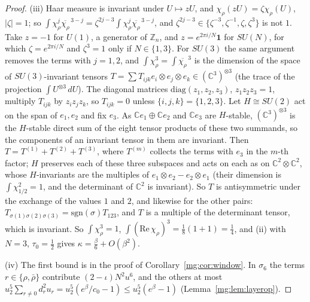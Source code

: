 \documentclass[11pt,a4paper]{article}
\theoremstyle{definition}
\theoremstyle{remark}
\newcommand{\C}{\mathbb{C}}
\newcommand{\dU}{\,dU}
\begin{document}
\begin{proof}
(iii) Haar measure is invariant under $U\mapsto zU$, and $\chi_\rho(zU)=\zeta\chi_\rho(U)$, $|\zeta|=1$; so
$\int\chi_\rho^j\overline{\chi_\rho}^{\,3-j}=\zeta^{2j-3}\int\chi_\rho^j\overline{\chi_\rho}^{\,3-j}$, and $\zeta^{2j-3}\in\{\zeta^{-3},\zeta^{-1},\zeta,\zeta^3\}$ is
not $1$. Take $z=-1$ for $U(1)$, a generator of $\mathbb Z_n$, and $z=e^{2\pi i/N}\mathbf1$ for $SU(N)$, for which $\zeta=e^{2\pi i/N}$ and $\zeta^3=1$ only
if $N\in\{1,3\}$. For $SU(3)$ the same argument removes the terms with $j=1,2$, and $\int\chi_\rho^3=\int\overline{\chi_\rho}^{\,3}$ is the dimension of the
space of $SU(3)$-invariant tensors $T=\sum T_{ijk}e_i\otimes e_j\otimes e_k\in(\C^3)^{\otimes3}$ (the trace of the projection $\int U^{\otimes3}\dU$). The
diagonal matrices $\mathrm{diag}(z_1,z_2,z_3)$, $z_1z_2z_3=1$, multiply $T_{ijk}$ by $z_iz_jz_k$, so $T_{ijk}=0$ unless $\{i,j,k\}=\{1,2,3\}$. Let
$H\cong SU(2)$ act on the span of $e_1,e_2$ and fix $e_3$. As $\C e_1\oplus\C e_2$ and $\C e_3$ are $H$-stable, $(\C^3)^{\otimes3}$ is the $H$-stable
direct sum of the eight tensor products of these two summands, so the components of an invariant tensor in them are invariant. Then $T=T^{(1)}+T^{(2)}+T^{(3)}$, where $T^{(m)}$ collects the terms with $e_3$ in the $m$-th
factor; $H$ preserves each of these three subspaces and acts on each as on $\C^2\otimes\C^2$, whose $H$-invariants are the multiples of
$e_1\otimes e_2-e_2\otimes e_1$ (their dimension is $\int\chi_{1/2}^2=1$, and the determinant of $\C^2$ is invariant). So $T$ is antisymmetric under the
exchange of the values $1$ and $2$, and likewise for the other pairs: $T_{\sigma(1)\sigma(2)\sigma(3)}=\mathrm{sgn}(\sigma)T_{123}$, and $T$ is a multiple of
the determinant tensor, which is invariant. So $\int\chi_\rho^3=1$,
$\int(\mathrm{Re}\,\chi_\rho)^3=\frac18(1+1)=\frac14$, and (ii) with $N=3$, $\tau_0=\frac12$ gives $\kappa=\frac\beta6+O(\beta^2)$.

(iv) The first bound is in the proof of Corollary~\ref{mg:cor:window}. In $\sigma_6$ the terms $r\in\{\rho,\bar\rho\}$ contribute $(2-\iota)N^2u^6$, and the
others at most $u_2^5\sum_{r\ne0}d_r^2u_r=u_2^5(e^\beta/c_0-1)\le u_2^5(e^\beta-1)$ (Lemma~\ref{mg:lem:layerop}).
\end{proof}
\end{document}
